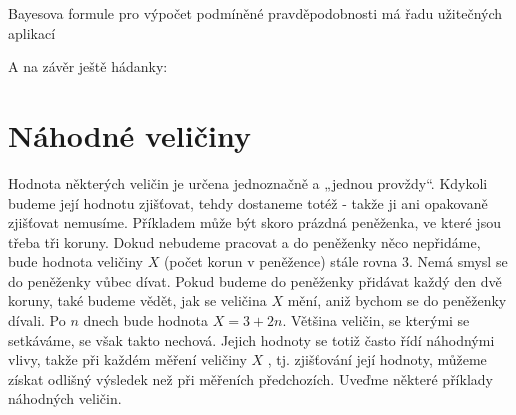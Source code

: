       Bayesova formule pro výpočet podmíněné pravděpodobnosti má řadu užitečných aplikací
      
      
      
      A na závěr ještě hádanky:

      
      
      
      
  \section{Náhodné veličiny}\label{mai:IchapIIIsecII}
    Hodnota některých veličin je určena jednoznačně a „jednou provždy“. Kdykoli budeme její hodnotu 
    zjišťovat, tehdy dostaneme totéž - takže ji ani opakovaně zjišťovat nemusíme. Příkladem může 
    být skoro prázdná peněženka, ve které jsou třeba tři koruny. Dokud nebudeme pracovat a do 
    peněženky něco nepřidáme, bude hodnota veličiny \(X\) (počet korun v peněžence) stále rovna 
    \num{3}. Nemá smysl se do peněženky vůbec dívat. Pokud budeme do peněženky přidávat každý den 
    dvě koruny, také budeme vědět, jak se veličina \(X\) mění, aniž bychom se do peněženky dívali. 
    Po \(n\) dnech bude hodnota \(X = 3 + 2n\). Většina veličin, se kterými se setkáváme, se však 
    takto nechová. Jejich hodnoty se totiž často řídí náhodnými vlivy, takže při každém
    měření veličiny \(X\) , tj. zjišťování její hodnoty, můžeme získat odlišný výsledek než při 
    měřeních předchozích. Uveďme některé příklady náhodných veličin.
    
